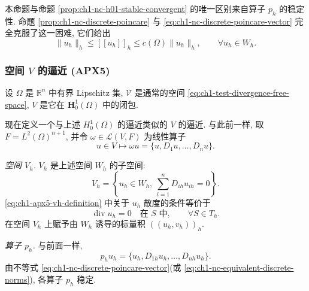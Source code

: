 \begin{Proof}
本命题与命题 \ref{prop:ch1-nc-h01-stable-convergent} 的唯一区别来自算子 $p_h$ 的稳定性. 命题 \ref{prop:ch1-nc-discrete-poincare} 与 \eqref{eq:ch1-nc-discrete-poincare-vector} 完全克服了这一困难, 它们给出
\begin{equation}
\|u_h\|_h\leq[[u_h]]_h\leq c(\Omega)\|u_h\|_h,
\qquad\forall u_h\in W_h.
\label{eq:ch1-nc-equivalent-discrete-norms}
\end{equation}
\end{Proof}

\subsubsection{空间 \texorpdfstring{$V$}{V} 的逼近 (APX5)}
\label{subsubsec:ch1-apx5-v-approximation}

设 $\Omega$ 是 $\mathbb R^n$ 中有界 Lipschitz 集, $\mathcal V$ 是通常的空间 \eqref{eq:ch1-test-divergence-free-space}, $V$ 是它在 $\mathbf H_0^1(\Omega)$ 中的闭包.

现在定义一个与上述 $H_0^1(\Omega)$ 的逼近类似的 $V$ 的逼近. 与此前一样, 取 $F=L^2(\Omega)^{n+1}$, 并令 $\omega\in\mathcal L(V,F)$ 为线性算子
\begin{equation}
u\in V\longmapsto\omega u=\{u,D_1u,\ldots,D_nu\}.
\label{eq:ch1-apx5-v-embedding}
\end{equation}

\emph{空间 $V_h$.} $V_h$ 是上述空间 $W_h$ 的子空间:
\begin{equation}
V_h=\left\{u_h\in W_h,\ \sum_{i=1}^nD_{ih}u_{ih}=0\right\}.
\label{eq:ch1-apx5-vh-definition}
\end{equation}
\eqref{eq:ch1-apx5-vh-definition} 中关于 $u_h$ 散度的条件等价于
\begin{equation}
\operatorname{div}u_h=0
\quad\text{在 }S\text{ 中},
\qquad\forall S\in T_h.
\label{eq:ch1-apx5-elementwise-divergence}
\end{equation}
在空间 $V_h$ 上赋予由 $W_h$ 诱导的标量积 $((u_h,v_h))_h$.

\emph{算子 $p_h$.} 与前面一样,
\[
p_hu_h=\{u_h,D_{1h}u_h,\ldots,D_{nh}u_h\}.
\]
由不等式 \eqref{eq:ch1-nc-discrete-poincare-vector}(或 \eqref{eq:ch1-nc-equivalent-discrete-norms}), 各算子 $p_h$ 稳定.

